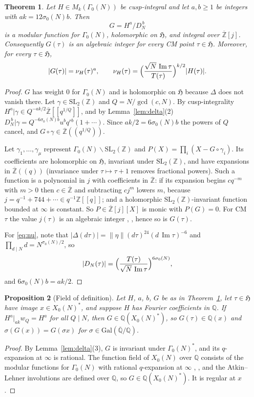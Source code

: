 \documentclass[11pt]{amsart}
\newtheorem{theorem}{Theorem}[section]
\newtheorem{proposition}[theorem]{Proposition}
\theoremstyle{definition}
\theoremstyle{remark}
\newcommand{\Z}{\mathbb{Z}}
\newcommand{\Q}{\mathbb{Q}}
\newcommand{\HH}{\mathfrak{H}}
\newcommand{\Zbar}{\overline{\Z}}
\newcommand{\Qbar}{\overline{\Q}}
\newcommand{\SL}{\mathrm{SL}}
\newcommand{\im}{\operatorname{Im}}
\newcommand{\sz}{\sigma_0}
\newcommand{\Xs}{X_0(N)^*}
\newcommand{\Gs}{\Gamma_0(N)^*}
\newcommand{\etanorm}[1]{\lVert\eta\rVert(#1)}
\begin{document}
\begin{theorem}\label{thm:integral}
Let $H\in M_k(\Gamma_0(N))$ be cusp-integral and let $a,b\ge1$ be integers with
$ak=12\sz(N)b$.  Then
\[
G=H^a/D_N^{\,b}
\]
is a modular function for $\Gamma_0(N)$, holomorphic on $\HH$, and integral over
$\Zbar[j]$.  Consequently $G(\tau)$ is an algebraic integer for every CM point
$\tau\in\HH$.  Moreover, for every $\tau\in\HH$,
\begin{equation}\label{eq:nu}
\lvert G(\tau)\rvert=\nu_H(\tau)^a,\qquad
\nu_H(\tau)=\Bigl(\frac{\sqrt N\,\im\tau}{T(\tau)}\Bigr)^{k/2}\lvert H(\tau)\rvert .
\end{equation}
\end{theorem}
\begin{proof}
$G$ has weight $0$ for $\Gamma_0(N)$ and is holomorphic on $\HH$ because $\Delta$
does not vanish there.  Let $\gamma\in\SL_2(\Z)$ and $Q=N/\gcd(c,N)$.  By
cusp-integrality $H^a|\gamma\in Q^{-ak/2}\Zbar[[q^{1/Q}]]$, and by
Lemma~\ref{lem:delta}(2)
$D_N^{\,b}|\gamma=Q^{-6\sz(N)b}u^bq^{rb}(1+\cdots)$.  Since
$ak/2=6\sz(N)b$ the powers of $Q$ cancel, and $G\circ\gamma\in\Zbar((q^{1/Q}))$.

Let $\gamma_1,\dots,\gamma_\mu$ represent $\Gamma_0(N)\backslash\SL_2(\Z)$ and
$P(X)=\prod_i(X-G\circ\gamma_i)$.  Its coefficients are holomorphic on $\HH$,
invariant under $\SL_2(\Z)$, and have expansions in $\Zbar((q))$ (invariance under
$\tau\mapsto\tau+1$ removes fractional powers).  Such a function is a polynomial
in $j$ with coefficients in $\Zbar$: if its expansion begins $cq^{-m}$ with
$m>0$ then $c\in\Zbar$ and subtracting $cj^m$ lowers $m$, because
$j=q^{-1}+744+\cdots\in q^{-1}\Z[[q]]$; and a holomorphic $\SL_2(\Z)$-invariant
function bounded at $\infty$ is constant.  So $P\in\Zbar[j][X]$ is monic with
$P(G)=0$.  For CM $\tau$ the value $j(\tau)$ is an algebraic integer
\cite[Thm.~11.1]{Cox}, \cite[II, Thm.~6.1]{SilvermanAT}, hence so is $G(\tau)$.

For \eqref{eq:nu}, note that
$\lvert\Delta(d\tau)\rvert=\etanorm{d\tau}^{24}(d\,\im\tau)^{-6}$ and
$\prod_{d\mid N}d=N^{\sz(N)/2}$, so
\[
\lvert D_N(\tau)\rvert=\Bigl(\frac{T(\tau)}{\sqrt N\,\im\tau}\Bigr)^{6\sz(N)},
\]
and $6\sz(N)b=ak/2$.
\end{proof}

\begin{proposition}[Field of definition]\label{prop:field}
Let $H$, $a$, $b$, $G$ be as in Theorem~\ref{thm:integral}, let $\tau\in\HH$ have
image $x\in\Xs$, and suppose $H$ has Fourier coefficients in $\Q$.  If
$H^a|_{ak}w_Q=H^a$ for all $Q\mid N$, then $G\in\Q(\Xs)$, so $G(\tau)\in\Q(x)$ and
$\sigma(G(x))=G(\sigma x)$ for $\sigma\in\mathrm{Gal}(\Qbar/\Q)$.
\end{proposition}
\begin{proof}
By Lemma~\ref{lem:delta}(3), $G$ is invariant under $\Gs$, and its $q$-expansion
at $\infty$ is rational.  The function field of $X_0(N)$ over $\Q$ consists of
the modular functions for $\Gamma_0(N)$ with rational $q$-expansion at $\infty$
\cite[Ch.~7]{DS}, \cite[Ch.~6]{Shimura}, and the Atkin--Lehner involutions
are defined over $\Q$, so $G\in\Q(\Xs)$.  It is regular at $x$.
\end{proof}
\end{document}
